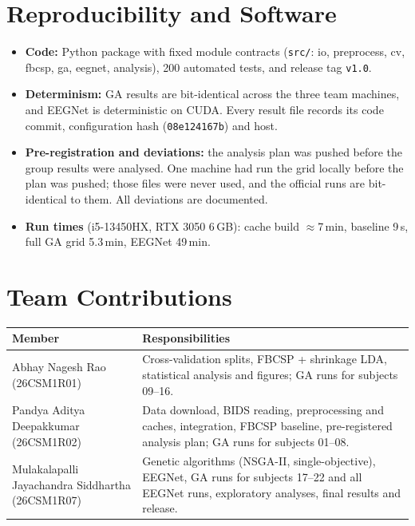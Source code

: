 \documentclass[11pt,a4paper]{article}
\begin{document}
\section{Reproducibility and Software}
\begin{itemize}
  \item \textbf{Code:} Python package with fixed module contracts (\texttt{src/}: io, preprocess, cv,
        fbcsp, ga, eegnet, analysis), 200 automated tests, and release tag \texttt{v1.0}.
  \item \textbf{Determinism:} GA results are bit-identical across the three team machines, and EEGNet is
        deterministic on CUDA. Every result file records its code commit, configuration hash
        (\texttt{08e124167b}) and host.
  \item \textbf{Pre-registration and deviations:} the analysis plan was pushed before the group results
        were analysed. One machine had run the grid locally before the plan was pushed; those files were
        never used, and the official runs are bit-identical to them. All deviations are documented.
  \item \textbf{Run times} (i5-13450HX, RTX 3050 6\,GB): cache build $\approx$7\,min, baseline 9\,s,
        full GA grid 5.3\,min, EEGNet 49\,min.
\end{itemize}

\section{Team Contributions}
\begin{tabularx}{\linewidth}{@{}lY@{}}
\toprule
Member & Responsibilities \\
\midrule
Abhay Nagesh Rao (26CSM1R01) & Cross-validation splits, FBCSP + shrinkage LDA, statistical analysis and figures; GA runs for subjects 09--16. \\
Pandya Aditya Deepakkumar (26CSM1R02) & Data download, BIDS reading, preprocessing and caches, integration, FBCSP baseline, pre-registered analysis plan; GA runs for subjects 01--08. \\
Mulakalapalli Jayachandra Siddhartha (26CSM1R07) & Genetic algorithms (NSGA-II, single-objective), EEGNet, GA runs for subjects 17--22 and all EEGNet runs, exploratory analyses, final results and release. \\
\bottomrule
\end{tabularx}
\end{document}
